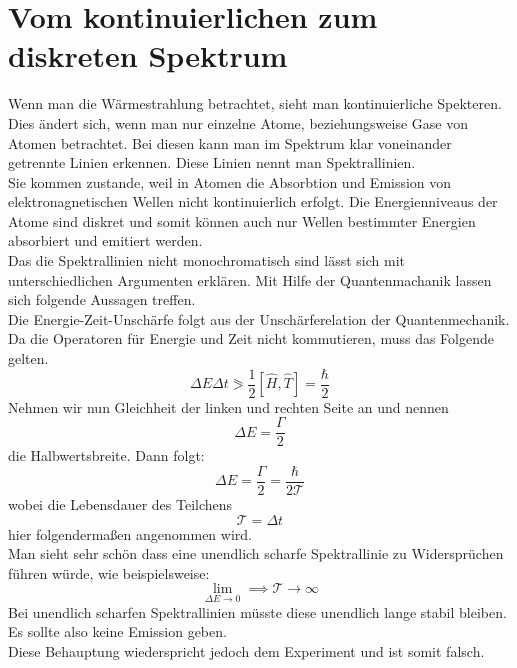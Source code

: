 

\section{Vom kontinuierlichen zum diskreten Spektrum}

Wenn man die Wärmestrahlung betrachtet, sieht man kontinuierliche Spekteren. Dies ändert sich, wenn man nur einzelne Atome, beziehungsweise Gase von Atomen betrachtet. Bei diesen kann man im
Spektrum klar voneinander getrennte Linien erkennen. Diese Linien nennt man Spektrallinien.\\
Sie kommen zustande, weil in Atomen die Absorbtion und Emission von elektronagnetischen Wellen nicht kontinuierlich erfolgt. Die Energienniveaus der Atome sind diskret und 
somit können auch nur Wellen bestimmter Energien absorbiert und emitiert werden.\\
Das die Spektrallinien nicht monochromatisch sind lässt sich mit unterschiedlichen Argumenten erklären. Mit Hilfe der Quantenmachanik lassen sich folgende Aussagen treffen.\\
Die Energie-Zeit-Unschärfe folgt aus der Unschärferelation der Quantenmechanik. Da die Operatoren für Energie und Zeit nicht kommutieren, muss das Folgende gelten.\\
\begin{equation}
    \Delta E  \Delta t \eqslantgtr \frac{1}{2} [ \hat{H},\hat{T}] =  \frac{\hbar }{2} 
\end{equation}
Nehmen wir nun Gleichheit der linken und rechten Seite an und nennen $$ \Delta E =\frac{\Gamma}{2}$$ die Halbwertsbreite. Dann folgt: \newline
\begin{equation}
    \Delta E =\frac{\Gamma}{2} = \frac{\hbar }{2\mathcal{T} } 
\end{equation}
wobei die Lebensdauer des Teilchens $$\mathcal{T} = \Delta t$$ hier folgendermaßen angenommen wird.\\
Man sieht sehr schön dass eine unendlich scharfe Spektrallinie zu Widersprüchen führen würde, wie beispielsweise:
\begin{equation}
    \lim_{\Delta E \to 0}  \implies \mathcal{T} \longrightarrow \infty 
\end{equation}
Bei unendlich scharfen Spektrallinien müsste diese unendlich lange stabil bleiben. Es sollte also keine Emission geben.\\
Diese Behauptung wiederspricht jedoch dem Experiment und ist somit falsch.